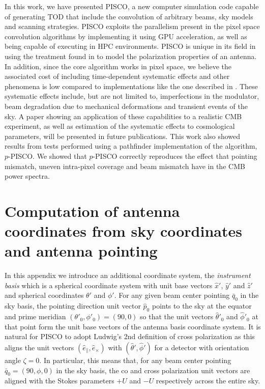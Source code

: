 \documentclass[a4paper,11pt]{article}
\newcommand{\co}{\mathbin{\|}}
\newcommand{\cx}{\mathbin{\times}}
\begin{document}
In this work, we have presented PISCO, a new computer simulation code capable of generating TOD that include the convolution of arbitrary beams, sky models and scanning strategies. PISCO exploits the parallelism present in the pixel space convolution algorithms by implementing it using GPU acceleration, as well as being capable of executing in HPC environments. PISCO is unique in its field in using the treatment found in \cite{2007MNRAS.376.1767O} to model the polarization properties of an antenna. In addition, since the core algorithm works in pixel space, we believe the associated cost of including time-dependent systematic effects and other phenomena is low compared to implementations like the one described in \cite{2018arXiv180905034D}. These systematic effects include, but are not limited to, imperfections in the modulator, beam degradation due to mechanical deformations and transient events of the sky. A paper showing an application of these capabilities to a realistic CMB experiment, as well as estimation of the systematic effects to cosmological parameters, will be presented in future publications. This work also showed results from tests performed using a pathfinder implementation of the algorithm, $p$-PISCO. We showed that $p$-PISCO correctly reproduces the effect that pointing mismatch, uneven intra-pixel coverage and beam mismatch have in the CMB power spectra. 




\appendix
\section{Computation of antenna coordinates from sky coordinates and antenna pointing}

In this appendix we introduce an additional coordinate system, the \textsl{instrument basis} which is a spherical coordinate system with unit base vectors $\hat{x}'$, $\hat{y}'$ and $\hat{z}'$ and spherical coordinates $\theta'$ and $\phi'$. For any given beam center pointing $\bar{q}_0$ in the sky basis, the pointing direction unit vector $\hat{p}_0$ points to the sky at the equator and prime meridian $(\theta'_0,\phi'_0) = (90,0)$ so that the unit vectors $\hat{\theta}'_0$ and $\hat{\phi}'_0$ at that point form the unit base vectors of the antenna basis coordinate system. It is natural for PISCO to adopt Ludwig's 2nd definition of cross polarization \cite{1140406} as this aligns the unit vectors $(\hat{e}_{\co},\hat{e}_{\cx})$ with $(\hat{\theta}',\hat{\phi}')$ for a detector with orientation angle $\zeta = 0$. In particular, this means that, for any beam center pointing $\bar{q}_0 = (90,\phi,0)$ in the sky basis, the co and cross polarization unit vectors are aligned with the Stokes parameters $+U$ and $-U$ respectively across the entire sky.
\end{document}
